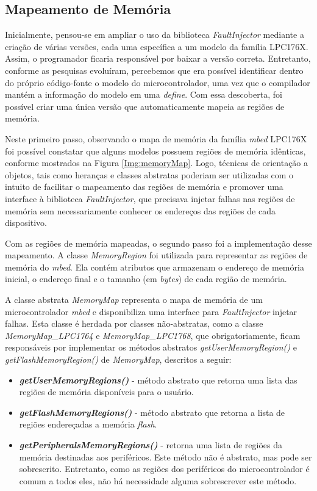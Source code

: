 \subsection{Mapeamento de Memória} \label{subsec:MapDeMemoria}

Inicialmente, pensou-se em ampliar o uso da biblioteca \textit{FaultInjector} mediante a criação de várias versões, cada uma específica a um modelo da família LPC176X. Assim, o programador ficaria responsável por baixar a versão correta. Entretanto, conforme as pesquisas evoluíram, percebemos que era possível identificar dentro do próprio código-fonte o modelo do microcontrolador, uma vez que o compilador mantém a informação do modelo em uma \textit{define}. Com essa descoberta, foi possível criar uma única versão que automaticamente mapeia as regiões de memória.

Neste primeiro passo, observando o mapa de memória da família \textit{mbed} LPC176X \cite{manualLpc176x:2016} foi possível constatar que alguns modelos possuem regiões de memória idênticas, conforme mostrados na Figura \ref{Img:memoryMap}. Logo, técnicas de orientação a objetos, tais como heranças e classes abstratas poderiam ser utilizadas com o intuito de facilitar o mapeamento das regiões de memória e promover uma interface à biblioteca \textit{FaultInjector}, que precisava injetar falhas nas regiões de memória sem necessariamente conhecer os endereços das regiões de cada dispositivo.

Com as regiões de memória mapeadas, o segundo passo foi a implementação desse mapeamento. A classe \textit{MemoryRegion}\cite{Kruger:2014} foi utilizada para representar as regiões de memória do \textit{mbed}. Ela contém atributos que armazenam o endereço de memória inicial, o endereço final e o tamanho (em \textit{bytes}) de cada região de memória. 

A classe abstrata \textit{MemoryMap} representa o mapa de memória de um microcontrolador \textit{mbed} e disponibiliza uma interface para \textit{FaultInjector} injetar falhas. Esta classe é herdada por classes não-abstratas, como a classe \textit{MemoryMap\_LPC1764} e \textit{MemoryMap\_LPC1768}, que obrigatoriamente, ficam responsáveis por implementar os métodos abstratos \textit{getUserMemoryRegion()} e \textit{getFlashMemoryRegion()} de \textit{MemoryMap}, descritos a seguir:

\begin{itemize}
	\item \textbf{\textit{getUserMemoryRegions()}} - método abstrato que retorna uma lista das regiões de memória disponíveis para o usuário.				
	
	\item \textbf{\textit{getFlashMemoryRegions()}} - método abstrato que retorna a lista de regiões endereçadas a memória \textit{flash}.
	
	\item \textbf{\textit{getPeripheralsMemoryRegions()}} - retorna uma lista de regiões da memória destinadas aos periféricos. Este método não é abstrato, mas pode ser sobrescrito. Entretanto, como as regiões dos periféricos do microcontrolador é comum a todos eles, não há necessidade alguma sobrescrever este método.
\end{itemize}


